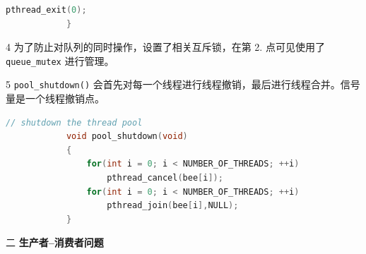 \documentclass[12pt,a4paper]{article}
\newenvironment{problems}{\begin{list}{}{\renewcommand{\makelabel}[1]{\textbf{##1}\hfil}}}{\end{list}}
\newenvironment{steps}{\begin{list}{}{\renewcommand{\makelabel}[1]{##1.\hfil}}}{\end{list}}
\begin{document}
\begin{problems}
\begin{steps}
\begin{lstlisting}[language=c]
                pthread_exit(0);
            }
        \end{lstlisting} 
        \item[4] 为了防止对队列的同时操作，设置了相关互斥锁，在第 2. 点可见使用了 \verb"queue_mutex" 进行管理。
        \item[5] \verb"pool_shutdown()" 会首先对每一个线程进行线程撤销，最后进行线程合并。信号量是一个线程撤销点。
        \begin{lstlisting}[language=c]
            // shutdown the thread pool
            void pool_shutdown(void)
            {
                for(int i = 0; i < NUMBER_OF_THREADS; ++i)
                    pthread_cancel(bee[i]);
                for(int i = 0; i < NUMBER_OF_THREADS; ++i)
                    pthread_join(bee[i],NULL);
            }
        \end{lstlisting} 
    \end{steps}
    \item[二] \textbf{生产者--消费者问题}
\end{problems} 
\end{document}
